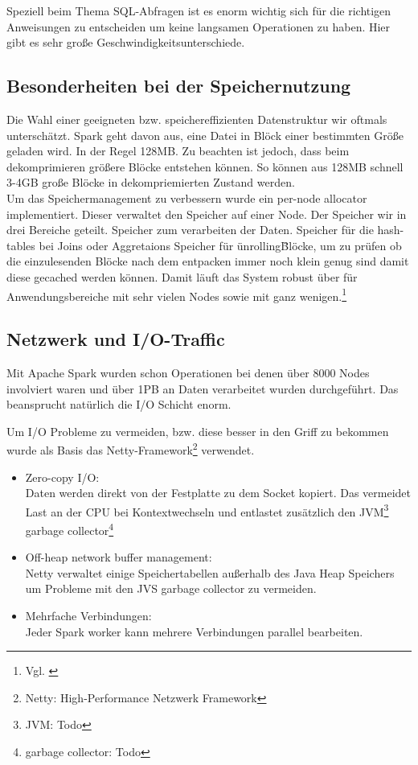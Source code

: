 \noindent
Speziell beim Thema SQL-Abfragen ist es enorm wichtig sich für die richtigen Anweisungen zu entscheiden um keine langsamen Operationen zu haben. 
Hier gibt es sehr große Geschwindigkeitsunterschiede.



\subsection{Besonderheiten bei der Speichernutzung}
Die Wahl einer geeigneten bzw. speichereffizienten Datenstruktur wir oftmals unterschätzt. 
Spark geht davon aus, eine Datei in Blöck einer bestimmten Größe geladen wird. In der Regel 128MB. Zu beachten ist jedoch, dass beim dekomprimieren größere Blöcke entstehen können. So können aus 128MB schnell 3-4GB große Blöcke in dekompriemierten Zustand werden. \\ 

\noindent
Um das Speichermanagement zu verbessern wurde ein per-node allocator implementiert. Dieser verwaltet den Speicher auf einer Node. 
Der Speicher wir in drei Bereiche geteilt. 
Speicher zum verarbeiten der Daten.  
Speicher für die hash-tables bei Joins oder Aggretaions
Speicher für \"unrolling\" Blöcke, um zu prüfen ob die einzulesenden Blöcke nach dem entpacken immer noch klein genug sind damit diese gecached werden können.
Damit läuft das System robust über für Anwendungsbereiche mit sehr vielen Nodes sowie mit ganz wenigen.\footnote{Vgl. \cite{ADD+15}}

\subsection{Netzwerk und I/O-Traffic}

Mit Apache Spark wurden schon Operationen bei denen über 8000 Nodes involviert waren und über 1PB an Daten verarbeitet wurden durchgeführt.
Das beansprucht natürlich die I/O Schicht enorm. 


Um I/O Probleme zu vermeiden, bzw. diese besser in den Griff zu bekommen wurde als Basis das Netty-Framework\footnote{Netty: High-Performance Netzwerk Framework} verwendet.
\begin{itemize}
	\item Zero-copy I/O:\\
	Daten werden direkt von der Festplatte zu dem Socket kopiert. Das vermeidet Last an der CPU bei Kontextwechseln und entlastet zusätzlich den JVM\footnote{JVM: Todo} garbage collector\footnote{garbage collector: Todo}
	\item Off-heap network buffer management:\\
	Netty verwaltet einige Speichertabellen außerhalb des Java Heap Speichers um Probleme mit den JVS garbage collector zu vermeiden.
	\item Mehrfache Verbindungen:\\
	Jeder Spark worker kann mehrere Verbindungen parallel bearbeiten.
\end{itemize}


